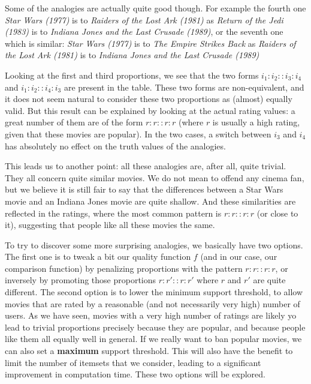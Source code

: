 Some of the analogies are actually quite good though. For example the fourth
one \textit{Star Wars (1977)} is to \textit{Raiders of the Lost Ark (1981)} as
\textit{Return of the Jedi (1983)} is to \textit {Indiana Jones and the Last
Crusade (1989)}, or the seventh one which is similar: \textit{Star Wars (1977)}
is to \textit{The Empire Strikes Back} as \textit{Raiders of the Lost Ark
(1981)} is to \textit{Indiana Jones and the Last Crusade (1989)}

Looking at the first and third proportions, we see that the two forms
$i_1:i_2::i_3:i_4$ and $i_1:i_2::i_4:i_3$ are present in the table. These two
forms are non-equivalent, and it does not seem natural to consider these two
proportions as (almost) equally valid. But this result can be explained by
looking at the actual rating values: a great number of them are of the form
$r:r::r:r$ (where $r$ is usually a high rating, given that these movies are
popular). In the two cases, a switch between $i_3$ and $i_4$ has absolutely no
effect on the truth values of the analogies.

This leads us to another point: all these analogies are, after all, quite
trivial. They all concern quite similar movies. We do not mean to offend any
cinema fan, but we believe it is still fair to say that the differences between
a Star Wars movie and an Indiana Jones movie are quite shallow. And these
similarities are reflected in the ratings, where the most common pattern is
$r:r::r:r$ (or close to it), suggesting that people like all these movies the
same.

To try to discover some more surprising analogies, we basically have two
options. The first one is to tweak a bit our quality function $f$ (and in our
case, our comparison function) by penalizing proportions with the pattern
$r:r::r:r$, or inversely by promoting those proportions $r : r' :: r :r'$ where
$r$ and $r'$ are quite different. The second option is to lower the minimum
support threshold, to allow movies that are rated by a reasonable (and not
necessarily very high) number of users. As we have seen, movies with a very
high number of ratings are likely yo lead to trivial proportions precisely
because they are popular, and because people like them all equally well in
general. If we really want to ban popular movies, we can also set a
\textbf{maximum} support threshold. This will also have the benefit to limit
the number of itemsets that we consider, leading to a significant improvement
in computation time. These two options will be explored.

